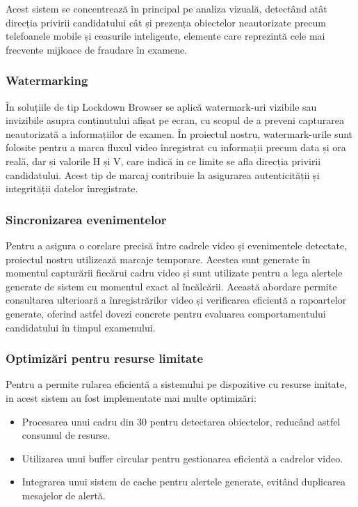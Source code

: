 \documentclass[12pt,a4paper]{article}
\begin{document}
Acest sistem se concentrează în principal pe analiza vizuală, detectând atât direcția privirii candidatului cât și prezența obiectelor neautorizate precum telefoanele mobile și ceasurile inteligente, elemente care reprezintă cele mai frecvente mijloace de fraudare în examene.
\subsubsection{Watermarking}
În soluțiile de tip Lockdown Browser se aplică watermark-uri vizibile sau invizibile asupra conținutului afișat pe ecran, cu scopul de a preveni capturarea neautorizată a informațiilor de examen. În proiectul nostru, watermark-urile sunt folosite pentru a marca fluxul video înregistrat cu informații precum data și ora reală, dar și valorile H și V, care indică in ce limite se afla direcția privirii candidatului. Acest tip de marcaj contribuie la asigurarea autenticității și integrității datelor înregistrate.

\subsubsection{Sincronizarea evenimentelor}
Pentru a asigura o corelare precisă între cadrele video și evenimentele detectate, proiectul nostru utilizează marcaje temporare. Acestea sunt generate în momentul capturării fiecărui cadru video și sunt utilizate pentru a lega alertele generate de sistem cu momentul exact al încălcării. Această abordare permite consultarea ulterioară a înregistrărilor video și verificarea eficientă a rapoartelor generate, oferind astfel dovezi concrete pentru evaluarea comportamentului candidatului în timpul examenului.
\subsubsection{Optimizări pentru resurse limitate}
Pentru a permite rularea eficientă a sistemului pe dispozitive cu resurse imitate, in acest sistem au fost implementate mai multe optimizări:
\begin{itemize}
    \item Procesarea unui cadru din 30 pentru detectarea obiectelor, reducând astfel consumul de resurse.
    \item Utilizarea unui buffer circular pentru gestionarea eficientă a cadrelor video.
    \item Integrarea unui sistem de cache pentru alertele generate, evitând duplicarea mesajelor de alertă.
\end{itemize}
\end{document}
